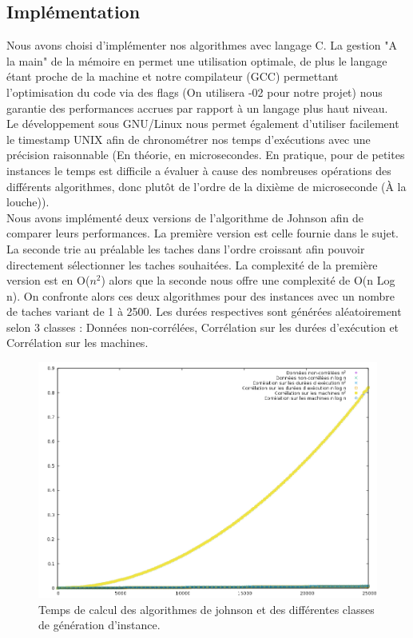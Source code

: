 \documentclass[12pt]{article}
\begin{document}
\subsection{Implémentation}

Nous avons choisi d'implémenter nos algorithmes avec langage C. La gestion "A la main" de la mémoire en permet une utilisation optimale, de plus le langage étant proche de la machine et notre compilateur (GCC) permettant l'optimisation du code via des flags (On utilisera -02 pour notre projet) nous garantie des performances accrues par rapport à un langage plus haut niveau. \\

Le développement sous GNU/Linux nous permet également d'utiliser facilement le timestamp UNIX afin de chronométrer nos temps d'exécutions avec une précision raisonnable (En théorie, en microsecondes. En pratique, pour de petites instances le temps est difficile a évaluer à cause des nombreuses opérations des différents algorithmes, donc plutôt de l'ordre de la dixième de microseconde (À la louche)).\\

Nous avons implémenté deux versions de l'algorithme de Johnson afin de comparer leurs performances. La première version est celle fournie dans le sujet. La seconde trie au préalable les taches dans l'ordre croissant afin pouvoir directement sélectionner les taches souhaitées. La complexité de la première version est en O($n^2$) alors que la seconde nous offre une complexité de O(n Log n). On confronte alors ces deux algorithmes pour des instances avec un nombre de taches variant de 1 à 2500. Les durées respectives sont générées aléatoirement selon 3 classes : Données non-corrélées, Corrélation sur les durées d'exécution et Corrélation sur les machines.\\

\begin{figure}[!ht]
\centering
\centerline{\includegraphics[scale=0.7]{johnson.png}}
\caption{Temps de calcul des algorithmes de johnson et des différentes classes de génération d'instance.}
\label{john}
\end{figure}
\end{document}
